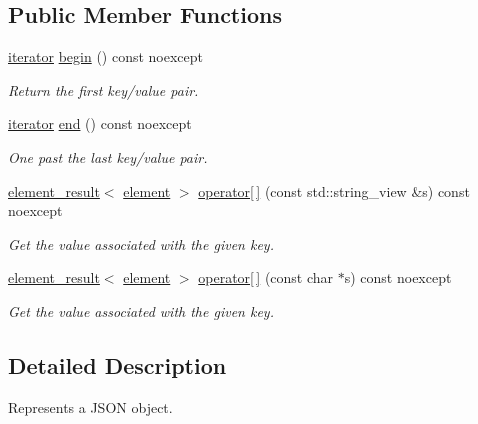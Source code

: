 \subsection*{Public Member Functions}
\begin{DoxyCompactItemize}
\item 
\hyperlink{classsimdjson_1_1document_1_1object_1_1iterator}{iterator} \hyperlink{classsimdjson_1_1document_1_1object_a88e638207141099532b524a8814540e0}{begin} () const noexcept
\begin{DoxyCompactList}\small\item\em Return the first key/value pair. \end{DoxyCompactList}\item 
\hyperlink{classsimdjson_1_1document_1_1object_1_1iterator}{iterator} \hyperlink{classsimdjson_1_1document_1_1object_a38ab9979d9eecb0b70768dcde9d12864}{end} () const noexcept
\begin{DoxyCompactList}\small\item\em One past the last key/value pair. \end{DoxyCompactList}\item 
\hyperlink{classsimdjson_1_1document_1_1element__result}{element\+\_\+result}$<$ \hyperlink{classsimdjson_1_1document_1_1element}{element} $>$ \hyperlink{classsimdjson_1_1document_1_1object_a5b52e82f66a45fb9a669a643aabf60ae}{operator\mbox{[}$\,$\mbox{]}} (const std\+::string\+\_\+view \&s) const noexcept
\begin{DoxyCompactList}\small\item\em Get the value associated with the given key. \end{DoxyCompactList}\item 
\hyperlink{classsimdjson_1_1document_1_1element__result}{element\+\_\+result}$<$ \hyperlink{classsimdjson_1_1document_1_1element}{element} $>$ \hyperlink{classsimdjson_1_1document_1_1object_a57e850feb7121e097754e5e82a5de2a4}{operator\mbox{[}$\,$\mbox{]}} (const char $\ast$s) const noexcept
\begin{DoxyCompactList}\small\item\em Get the value associated with the given key. \end{DoxyCompactList}\end{DoxyCompactItemize}


\subsection{Detailed Description}
Represents a J\+S\+ON object. 

